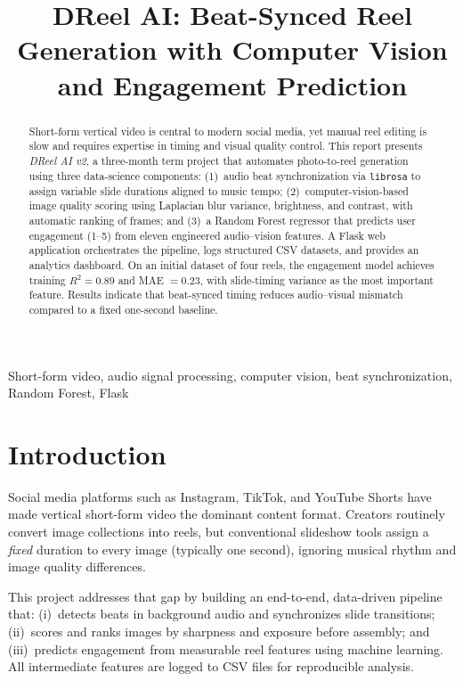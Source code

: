 \documentclass{article}
\title{DReel AI: Beat-Synced Reel Generation with Computer Vision and Engagement Prediction}
\begin{document}
\ninept
\maketitle

\begin{abstract}
Short-form vertical video is central to modern social media, yet manual reel editing is slow and requires expertise in timing and visual quality control.
This report presents \emph{DReel AI v2}, a three-month term project that automates photo-to-reel generation using three data-science components: (1)~audio beat synchronization via \texttt{librosa} to assign variable slide durations aligned to music tempo; (2)~computer-vision-based image quality scoring using Laplacian blur variance, brightness, and contrast, with automatic ranking of frames; and (3)~a Random Forest regressor that predicts user engagement (1--5) from eleven engineered audio--vision features.
A Flask web application orchestrates the pipeline, logs structured CSV datasets, and provides an analytics dashboard.
On an initial dataset of four reels, the engagement model achieves training $R^2 = 0.89$ and MAE $= 0.23$, with slide-timing variance as the most important feature.
Results indicate that beat-synced timing reduces audio--visual mismatch compared to a fixed one-second baseline.
\end{abstract}

\begin{keywords}
Short-form video, audio signal processing, computer vision, beat synchronization, Random Forest, Flask
\end{keywords}

\section{Introduction}
\label{sec:intro}

Social media platforms such as Instagram, TikTok, and YouTube Shorts have made vertical short-form video the dominant content format.
Creators routinely convert image collections into reels, but conventional slideshow tools assign a \emph{fixed} duration to every image (typically one second), ignoring musical rhythm and image quality differences.

This project addresses that gap by building an end-to-end, data-driven pipeline that: (i)~detects beats in background audio and synchronizes slide transitions; (ii)~scores and ranks images by sharpness and exposure before assembly; and (iii)~predicts engagement from measurable reel features using machine learning.
All intermediate features are logged to CSV files for reproducible analysis.
\end{document}
